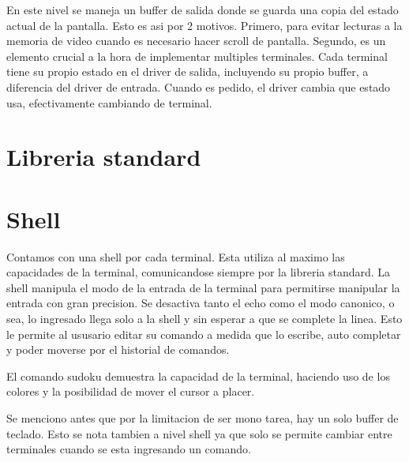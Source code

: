 \documentclass[a4paper,10pt]{article}
\begin{document}
            En este nivel se maneja un buffer de salida donde se guarda una copia del estado actual de la pantalla.
            Esto es asi por 2 motivos.
            Primero, para evitar lecturas a la memoria de video cuando es necesario hacer scroll de pantalla.
            Segundo, es un elemento crucial a la hora de implementar multiples terminales.
            Cada terminal tiene su propio estado en el driver de salida, incluyendo su propio buffer, a diferencia del driver de entrada.
            Cuando es pedido, el driver cambia que estado usa, efectivamente cambiando de terminal.

\section{Libreria standard}

\section{Shell}
    Contamos con una shell por cada terminal.
    Esta utiliza al maximo las capacidades de la terminal, comunicandose siempre por la libreria standard.
    La shell manipula el modo de la entrada de la terminal para permitirse manipular la entrada con gran precision.
    Se desactiva tanto el echo como el modo canonico, o sea, lo ingresado llega solo a la shell y sin esperar a que se complete la linea.
    Esto le permite al ususario editar su comando a medida que lo escribe, auto completar y poder moverse por el historial de comandos.

    El comando sudoku demuestra la capacidad de la terminal, haciendo uso de los colores y la posibilidad de mover el cursor a placer.

    Se menciono antes que por la limitacion de ser mono tarea, hay un solo buffer de teclado.
    Esto se nota tambien a nivel shell ya que solo se permite cambiar entre terminales cuando se esta ingresando un comando.
\end{document}

